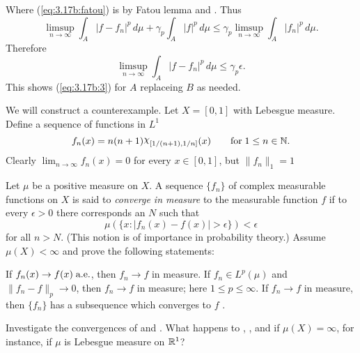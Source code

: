 \begin{enumerate}
\begin{itemize}
 Where (\ref{eq:3.17b:fatou}) is by Fatou lemma and .
 Thus
 \begin{equation*}
  \limsup_{n\to\infty} \int_A |f - f_n|^p\,d\mu  + \gamma_p \int_A |f|^p\,d\mu
  \leq \gamma_p \limsup_{n\to\infty} \int_A |f_n|^p\,d\mu.
 \end{equation*}
 Therefore
 \begin{equation*}
  \limsup_{n\to\infty} \int_A |f - f_n|^p\,d\mu  \leq \gamma_p \epsilon.
 \end{equation*}
 This shows (\ref{eq:3.17b:3}) for $A$ replaceing $B$ as needed.


 We will construct a counterexample.
 Let \(X=[0,1]\) with Lebesgue measure.
 Define a sequence of functions in \(L^1\)
 \begin{equation*}
   f_n(x) = n(n+1)\chhi_{[1/(n+1),1/n]}(x) \qquad \textrm{for}\; 1\leq n\in\N.
 \end{equation*}
Clearly \(\lim_{n\to\infty} f_n(x) = 0\) for every \(x\in[0,1]\), but
\(\|f_n\|_1 = 1\)

\end{itemize}


\begin{excopy}
Let \(\mu\) be a positive measure on $X$. A sequence \(\{f_n\}\) of complex
measurable functions on $X$ is said to \emph{converge in measure}
to the measurable function $f$ if to every \(\epsilon>0\) there corresponds
an $N$ such that
\begin{equation*}
 \mu(\{x: |f_n(x) - f(x)| > \epsilon\}) < \epsilon
\end{equation*}
for all \(n>N\).
(This notion is of importance in probability theory.)
Assume \(\mu(X)<\infty\) and prove the following statements:
\begin{itemize}
  If \(f_n(x)\to f(x)\;\textrm{a.e.}\), then \(f_n\to f\) in measure.
  If \(f_n\in L^p(\mu)\) and \(\|f_n-f\|_p \to 0\),
            then \(f_n\to f\) in measure; here \(1\leq p \leq \infty\).
  If  \(f_n\to f\) in measure, then \(\{f_n\}\) has a subsequence
            which converges to $f$ \aded.
\end{itemize}
Investigate the convergences of  and .
What happens to , , and  if \(\mu(X)=\infty\),
for instance, if \(\mu\) is Lebesgue measure on \(\mathbb{R}^1\)?
\end{excopy}



\end{enumerate}

